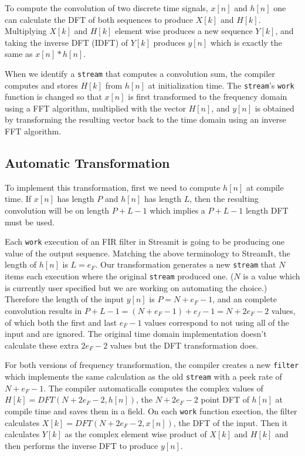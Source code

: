 
To compute the convolution of two discrete time signals, $x[n]$ and $h[n]$ 
one can calculate the DFT of both sequences to produce 
$X[k]$ and $H[k]$. Multiplying $X[k]$ and $H[k]$ element wise
produces a new sequence $Y[k]$, and taking the inverse DFT (IDFT) of $Y[k]$ 
produces $y[n]$ which is exactly the same as $x[n]*h[n]$.

When we identify a {\tt stream} that computes a convolution sum, the
compiler computes and stores $H[k]$ from $h[n]$ at initialization
time. The {\tt stream}'s {\tt work} function is changed so that $x[n]$
is first transformed to the frequency domain using a FFT algorithm,
multiplied with the vector $H[n]$, and $y[n]$ is obtained by
transforming the resulting vector back to the time domain using an
inverse FFT algorithm.

\subsection{Automatic Transformation}

To implement this transformation, first we need to compute $h[n]$ at
compile time.  If $x[n]$ has length $P$ and $h[n]$ has length $L$,
then the resulting convolution will be on length $P+L-1$ which implies
a $P+L-1$ length DFT must be used.

Each {\tt work} execution of an FIR filter in Streamit is going to be 
producing one value of the output sequence. Matching the above terminology to StreamIt, 
the length of $h[n]$ is $L=e_F$. Our transformation generates a new {\tt stream} that
$N$ items each execution where the original {\tt stream} produced one. ($N$ is a value
which is currently user specified but we are working on automating the choice.)
Therefore the length of the input $y[n]$ is $P=N+e_F-1$, and an complete convolution results in 
$P+L-1=(N+e_F-1)+e_f-1=N+2e_F-2$ values, of which both the first and last $e_F-1$ values 
correspond to not using all of the input and are ignored. The original time domain 
implementation doesn't calculate these extra $2e_F-2$ values but the DFT transformation does.

For both versions of frequency transformation, the compiler creates a new {\tt filter} which
implements the same calculation as the old {\tt stream} with a peek rate of $N+e_F-1$.
The compiler automaticalls computes the complex values of $H[k]=DFT(N+2e_F-2,h[n])$, 
the $N+2e_F-2$  point DFT of $h[n]$ at compile time and saves them in a field. On each {\tt work}
function exection, the filter calculates $X[k]=DFT(N+2e_F-2,x[n])$, the DFT of the input.
Then it calculates $Y[k]$ as the complex element wise product of $X[k]$ and $H[k]$ and
then performs the inverse DFT to produce $y[n]$.

